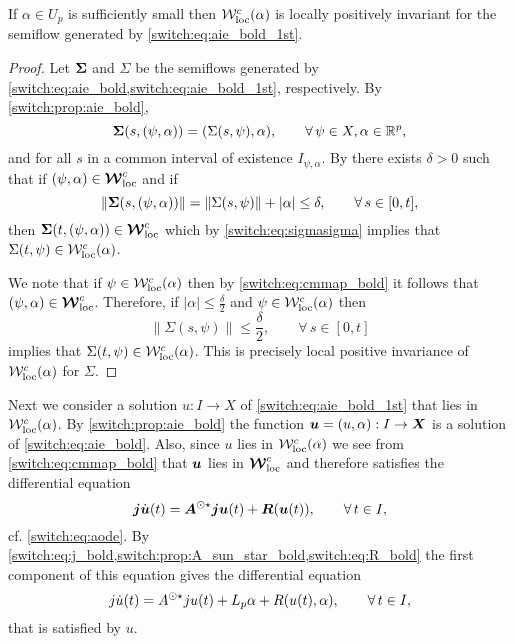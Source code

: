 \begin{proposition}
  If $\alpha \in U_p$ is sufficiently small then $\mathcal{W}^c_{\text{loc}}(\alpha)$ is locally positively invariant for the semiflow generated by \cref{switch:eq:aie_bold_1st}.
\end{proposition}
\begin{proof}
  Let $\boldsymbol{\Sigma}$ and $\Sigma$ be the semiflows generated by \cref{switch:eq:aie_bold,switch:eq:aie_bold_1st}, respectively. By \cref{switch:prop:aie_bold},
  \begin{equation}
    \label{switch:eq:sigmasigma}
    \boldsymbol{\Sigma}(s, (\psi, \alpha)) = (\Sigma(s, \psi), \alpha), \qquad \forall\,\psi \in X,\alpha \in \mathbb{R}^p,
  \end{equation}
  and for all $s$ in a common interval of existence $I_{\psi,\alpha}$. By \cite[Theorem IX.5.3(i)]{diekmann1995delay} there exists $\delta > 0$ such that if $(\psi, \alpha) \in \boldsymbol{\mathcal{W}}^c_{\text{loc}}$ and if
  \[
    \|\boldsymbol{\Sigma}(s, (\psi, \alpha))\| = \|\Sigma(s, \psi)\| + |\alpha| \le \delta, \qquad \forall\,s \in [0,t],
  \]
  then $\boldsymbol{\Sigma}(t, (\psi, \alpha)) \in \boldsymbol{\mathcal{W}}^c_{\text{loc}}$ which by \cref{switch:eq:sigmasigma} implies that $\Sigma(t, \psi) \in \mathcal{W}^c_{\text{loc}}(\alpha)$.

  We note that if $\psi \in \mathcal{W}^c_{\text{loc}}(\alpha)$ then by \cref{switch:eq:cmmap_bold} it follows that $(\psi, \alpha) \in \boldsymbol{\mathcal{W}}^c_{\text{loc}}$. Therefore, if $|\alpha| \le \frac{\delta}{2}$ and $\psi \in \mathcal{W}^c_{\text{loc}}(\alpha)$ then
  \[
    \|\Sigma(s, \psi)\| \le \frac{\delta}{2}, \qquad \forall\,s \in [0,t]
  \]
  implies that $\Sigma(t, \psi) \in \mathcal{W}^c_{\text{loc}}(\alpha)$. This is precisely local positive invariance of $\mathcal{W}^c_{\text{loc}}(\alpha)$ for $\Sigma$.
\end{proof}

Next we consider a solution $u : I \to X$ of \cref{switch:eq:aie_bold_1st} that lies in $\mathcal{W}^c_{\text{loc}}(\alpha)$. By \cref{switch:prop:aie_bold} the function $\boldsymbol{u} = (u, \alpha) : I \to \boldsymbol{X}$ is a solution of \cref{switch:eq:aie_bold}. Also, since $u$ lies in $\mathcal{W}^c_{\text{loc}}(\alpha)$ we see from \cref{switch:eq:cmmap_bold} that $\boldsymbol{u}$ lies in $\boldsymbol{\mathcal{W}}^c_{\text{loc}}$ and therefore satisfies the differential equation
\[
  \boldsymbol{j}\dot{\boldsymbol{u}}(t) = \boldsymbol{A}^{\odot\star}\boldsymbol{j}\boldsymbol{u}(t) + \boldsymbol{R}(\boldsymbol{u}(t)), \qquad \forall\,t \in I,
\]
cf. \cref{switch:eq:aode}. By \cref{switch:eq:j_bold,switch:prop:A_sun_star_bold,switch:eq:R_bold} the first component of this equation gives the differential equation
\begin{equation}
  \label{switch:eq:ode_on_cm_abstract}
  j\dot{u}(t) = A^{\odot\star}ju(t) + L_p\alpha + R(u(t),\alpha), \qquad \forall\,t \in I,
\end{equation}
that is satisfied by $u$.

